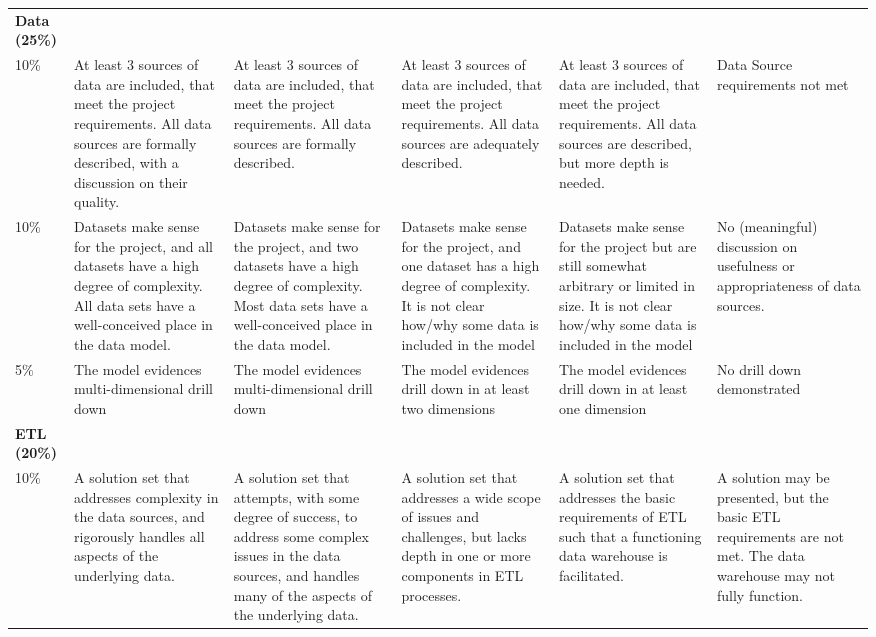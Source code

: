 \documentclass{article}[a4paper,12pt]
\begin{document}
\begin{landscape}
\begin{center}
\begin{longtable}{|p{.15\linewidth}||*5{p{.15\linewidth}|}}
	\textbf{Data (25\%)} & & & & & \\
	10\%	
	& At least 3 sources of data are included, that meet the project requirements. All data sources are formally described, with a discussion on their quality. 
	& At least 3 sources of data are included, that meet the project requirements. All data sources are formally described.
	& At least 3 sources of data are included, that meet the project requirements. All data sources are adequately described. 
	& At least 3 sources of data are included, that meet the project requirements. All data sources are described, but more depth is needed. 
	& Data Source requirements not met \\\cline{2-6}
	
	10\% 
	& Datasets make sense for the project, and all datasets have a high degree of complexity. All data sets have a well-conceived place in the data model.
 	& Datasets make sense for the project, and two datasets have a high degree of complexity. Most data sets have a well-conceived place in the data model.
	& Datasets make sense for the project, and one dataset has a high degree of complexity. It is not clear how/why some data is included in the model
	& Datasets make sense for the project but are still somewhat arbitrary or limited in size. It is not clear how/why some data is included in the model
 	& No (meaningful) discussion on usefulness or appropriateness of data sources. \\\cline{2-6}
 	
 	5\%
 	& The model evidences multi-dimensional drill down 
 	& The model evidences multi-dimensional drill down 
 	& The model evidences drill down in at least two dimensions 
 	& The model evidences drill down in at least one dimension
 	& No drill down demonstrated \\\hline
	
	\textbf{ETL (20\%)} & & & & & \\
	10\%	
	& A solution set that addresses complexity in the data sources, and rigorously handles all aspects of the underlying data.
	& A solution set that attempts, with some degree of success, to address some complex issues in the data sources, and handles many of the aspects of the underlying data.
	& A solution set that addresses a wide scope of issues and challenges, but lacks depth in one or more components in ETL processes.
	& A solution set that addresses the basic requirements of ETL such that a functioning data warehouse is facilitated. 
	& A solution may be presented, but the basic ETL requirements are not met. The data warehouse may not fully function. \\\cline{2-6}
	

\end{longtable}
\end{center}
\end{landscape}
\end{document}
